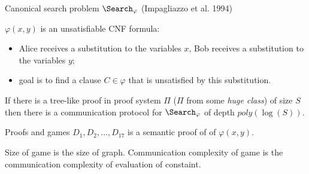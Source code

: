 \begin{frame}{Canonical search problem $\Search_{\varphi}$ (Impagliazzo et al. 1994)}

	
    $\varphi(x, y)$ is an unsatisfiable CNF formula:
    \begin{itemize}
        \item Alice receives a substitution to the variables $x$, Bob receives a substitution to the
            variables $y$;
        \item goal is to find a clause $C \in \varphi$ that is unsatisfied by this substitution.
    \end{itemize}

    \pause

    \begin{theorem}
        If there is a {\color{blue} tree-like} proof in proof system $\Pi$ ($\Pi$ from some \textit{huge
          class}) of size $S$ then there is a communication protocol for $\Search_{\varphi}$ of depth
        $poly(\log(S))$.
    \end{theorem}
    
\end{frame}


\begin{frame}{Proofs and games}
	$D_1, D_2, \dots, D_{17}$ is a semantic proof of of $\varphi(x, y)$.

    \begin{center}
    	    
    \end{center}

    \pause
    \pause
    \pause
    \pause
    \pause
    \pause
    \pause
    \pause
    \pause
    Size of game is the size of graph. Communication complexity of game is the communication complexity
    of evaluation of constaint.

\end{frame}




